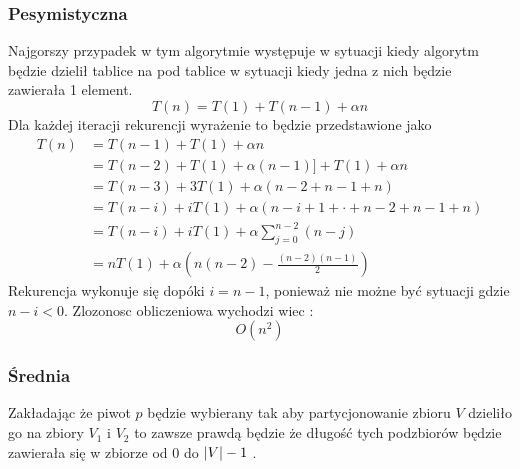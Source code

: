 \subsubsection{Pesymistyczna}
Najgorszy przypadek w tym algorytmie występuje w sytuacji kiedy algorytm będzie dzielił tablice na pod tablice w sytuacji kiedy jedna z nich będzie zawierała 1 element.
\begin{equation*}
T(n) =T(1) +T(n−1) + \alpha n
\end{equation*}
Dla każdej iteracji rekurencji wyrażenie to będzie przedstawione jako 
\begin{align*}
T(n) &=T(n−1) +T(1) + \alpha n \\
	 &= T(n−2) +T(1) +\alpha(n−1)] +T(1) + \alpha n \\
	 &= T(n−3) + 3T(1) +\alpha(n−2 +n−1 +n) \\
	 &= T(n−i) +iT(1) +\alpha(n−i+ 1 + \cdot + n−2 +n−1 +n) \\
	 &= T(n−i) +iT(1) +\alpha \sum_{j=0}^{n-2}(n-j) \\ 
	 &= nT(1) +\alpha(n(n−2)−\frac{(n−2)(n−1)}{2})
 \end{align*}
Rekurencja wykonuje się dopóki $i=n-1$, ponieważ nie możne być sytuacji gdzie $n-i <0$.
Zlozonosc obliczeniowa wychodzi wiec :
\begin{equation*}
O(n^2)
\end{equation*}
\subsubsection{Średnia}
Zakładając że piwot $p$ będzie wybierany tak aby partycjonowanie zbioru $V $ dzieliło go na zbiory $V_1$ i $V_2$ to zawsze prawdą będzie że długość tych podzbiorów będzie zawierała się w zbiorze od $0$ do $ \lvert V \rvert-1$ \cite{quicksortAVG}.

